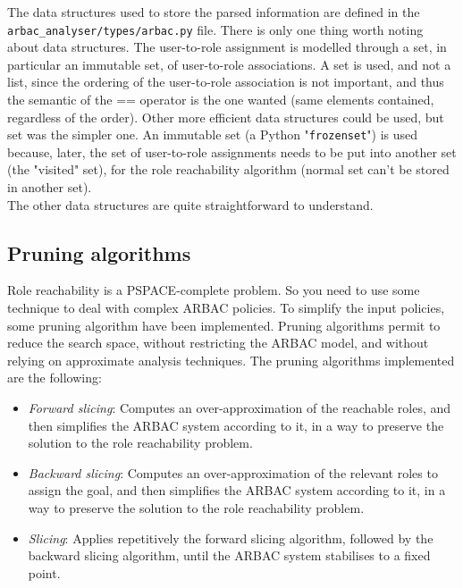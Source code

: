 \documentclass{article}
\begin{document}
The data structures used to store the parsed information are defined in the
\lstinline[columns=fixed]{arbac_analyser/types/arbac.py} file.
There is only one thing worth noting about data structures.
The user-to-role assignment is modelled through a set, in particular an immutable set,
of user-to-role associations.
A set is used, and not a list, since the ordering of the user-to-role association
is not important, and thus the semantic of the == operator is the one wanted
(same elements contained, regardless of the order). Other more efficient data structures
could be used, but set was the simpler one.
An immutable set (a Python "\lstinline[columns=fixed]{frozenset}") is used because,
later, the set of user-to-role assignments needs to be put into another set (the "visited" set),
for the role reachability algorithm (normal set can't be stored in another set). \\
The other data structures are quite straightforward to understand.

\subsection{Pruning algorithms}
Role reachability is a PSPACE-complete problem. So you need to use some technique
to deal with complex ARBAC policies.
To simplify the input policies, some pruning algorithm have been implemented.
Pruning algorithms permit to reduce the search space, without restricting the ARBAC model,
and without relying on approximate analysis techniques.
The pruning algorithms implemented are the following:
\begin{itemize}
\item \emph{Forward slicing}: Computes an over-approximation of the reachable roles,
and then simplifies the ARBAC system according to it, in a way to preserve the
solution to the role reachability problem.

\item \emph{Backward slicing}: Computes an over-approximation of the relevant roles to
assign the goal, and then simplifies the ARBAC system according to it, in a way to preserve
the solution to the role reachability problem.

\item \emph{Slicing}: Applies repetitively the forward slicing algorithm, followed by the backward
slicing algorithm, until the ARBAC system stabilises to a fixed point.
\end{itemize}
\end{document}
